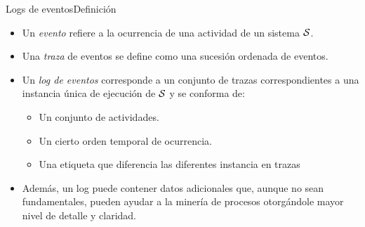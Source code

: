 \documentclass[spanish,pdf]{beamer}
\begin{document}
\begin{frame}{Logs de eventos}{Definición}
  \begin{itemize}
    \setlength\itemsep{0.2cm}
    \item<2-> Un \textit{evento} refiere a la ocurrencia de una actividad de un sistema $\mathcal{S}$.
    \item<3-> Una \textit{traza} de eventos se define como una sucesión ordenada de eventos.
    \item<4-> Un \textit{log de eventos} corresponde a un conjunto de trazas correspondientes 
              a una instancia única de ejecución de $\mathcal{S}$ y se conforma de:
              \begin{itemize}
                  \item Un conjunto de actividades.
                  \item Un cierto orden temporal de ocurrencia.
                  \item Una etiqueta que diferencia las diferentes instancia en trazas
              \end{itemize}
    \item<5-> Además, un log puede contener datos adicionales que, aunque no sean fundamentales, pueden
ayudar a la minería de procesos otorgándole mayor nivel de detalle y claridad.
  \end{itemize}
\end{frame}
\end{document}
